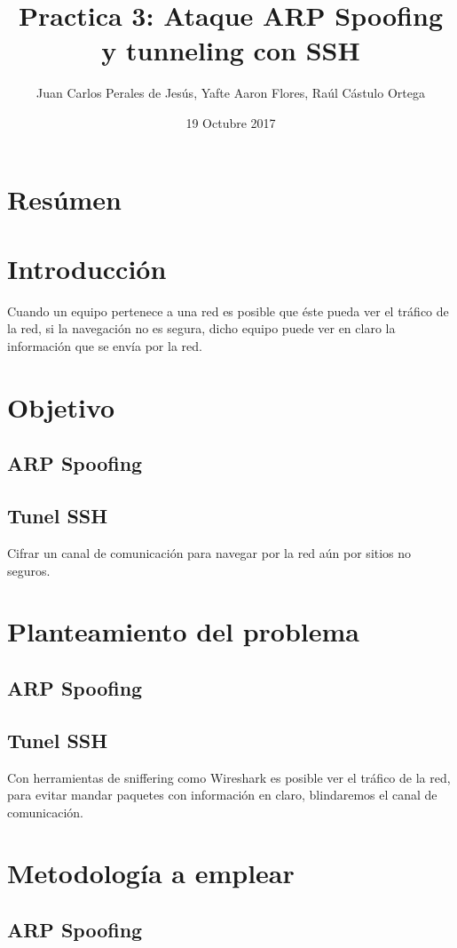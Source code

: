 \documentclass{article}
\title{Practica 3: Ataque ARP Spoofing y tunneling con SSH}
\author{Juan Carlos Perales de Jes\'us, Yafte Aaron Flores, Ra\'ul C\'astulo Ortega}
\date{19 Octubre 2017}
\begin{document}
\maketitle
\newpage

\section{Res\'umen}

\section{Introducci\'on}
Cuando un equipo pertenece a una red es posible que \'este pueda ver el tr\'afico de la red, si la navegaci\'on no es segura, dicho equipo puede ver en claro la informaci\'on que se env\'ia por la red.
 
\section{Objetivo}
\subsection{ARP Spoofing}
\subsection{Tunel SSH}
Cifrar un canal de comunicaci\'on para navegar por la red a\'un por sitios no seguros.

\section{Planteamiento del problema}
\subsection{ARP Spoofing}

\subsection{Tunel SSH}
Con herramientas de sniffering como Wireshark es posible ver el tr\'afico de la red, para evitar mandar paquetes con informaci\'on en claro, blindaremos el canal de comunicaci\'on.

\section{Metodolog\'ia a emplear}
\subsection{ARP Spoofing}
\end{document}

